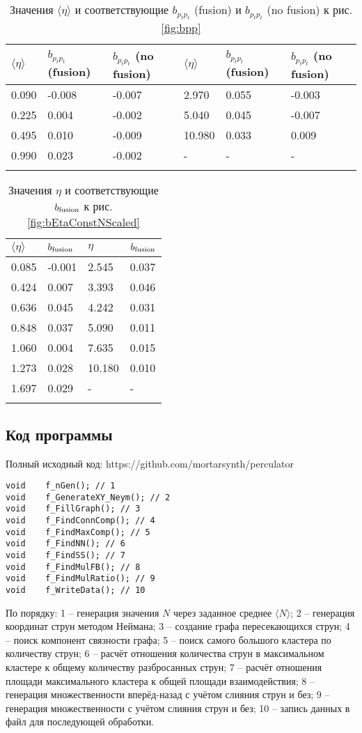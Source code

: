 {\scriptsize
\begin{longtable}{| l | l | l || l | l | l |}
	\hline
	$\langle \eta \rangle$	&	$b_{p_tp_t}$ (fusion)	&	$b_{p_tp_t}$ (no fusion)	&	$\langle \eta \rangle$	&	$b_{p_tp_t}$ (fusion)	&	$b_{p_tp_t}$ (no fusion)	\\
	\hline
	0.090	&	-0.008	&	-0.007	&	2.970	&	0.055	&	-0.003	\\
	0.225	&	0.004	&	-0.002	&	5.040	&	0.045	&	-0.007	\\
	0.495	&	0.010	&	-0.009	&	10.980	&	0.033	&	0.009	\\
	0.990	&	0.023	&	-0.002	&	-		&	-		&		-	\\
	\hline
	\caption{Значения $\langle \eta \rangle$ и соответствующие $b_{p_tp_t}$ (fusion) и $b_{p_tp_t}$ (no fusion) к рис. \ref{fig:bpp}} \label{tab:bnn}
\end{longtable}}

{\scriptsize
\begin{longtable}{| l | l || l | l |}
	\hline
	$\langle \eta \rangle$	&	$b_{\textnormal{fusion}}$	&	$\eta$	&	$b_{\textnormal{fusion}}$	\\
	\hline
	0.085	&	-0.001	&	2.545	&	0.037	\\
	0.424	&	0.007	&	3.393	&	0.046	\\
	0.636	&	0.045	&	4.242	&	0.031	\\
	0.848	&	0.037	&	5.090	&	0.011	\\
	1.060	&	0.004	&	7.635	&	0.015	\\
	1.273	&	0.028	&	10.180	&	0.010	\\
	1.697	&	0.029	&	-		&	-	\\
	\hline
	\caption{Значения $\eta$ и соответствующие $b_{\textnormal{fusion}}$ к рис. \ref{fig:bEtaConstNScaled}} \label{tab:bEtaConstN}
\end{longtable}}
\newpage
\subsection{Код программы}
Полный исходный код: https://github.com/mortarsynth/perculator
\begin{lstlisting}
void	f_nGen(); // 1
void	f_GenerateXY_Neym(); // 2
void	f_FillGraph(); // 3
void	f_FindConnComp(); // 4
void	f_FindMaxComp(); // 5
void	f_FindNN(); // 6
void	f_FindSS(); // 7
void	f_FindMulFB(); // 8
void	f_FindMulRatio(); // 9
void	f_WriteData(); // 10
\end{lstlisting}
По порядку:  1 -- генерация значения $N$ через заданное среднее $\langle N \rangle$; 2 -- генерация координат струн методом Неймана; 3 -- создание графа пересекающихся струн; 4 -- поиск компонент связности графа; 5 -- поиск самого большого кластера по количеству струн; 6 -- расчёт отношения количества струн в максимальном кластере к общему количеству разбросанных струн; 7 -- расчёт отношения площади максимального кластера к общей площади взаимодействия; 8 -- генерация множественности вперёд-назад с учётом слияния струн и без; 9 -- генерация множественности с учётом слияния струн и без; 10 -- запись данных в файл для последующей обработки.


